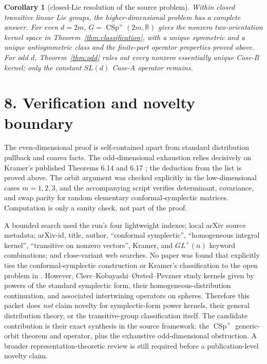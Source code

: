 \documentclass[11pt]{article}
\newtheorem{corollary}[theorem]{Corollary}
\newcommand{\R}{\mathbb R}
\newcommand{\CSp}{\operatorname{CSp}^{+}}
\begin{document}
\begin{corollary}[closed-Lie resolution of the source problem]\label{cor:full}
Within closed transitive linear Lie groups, the higher-dimensional problem has a complete answer.  For even $d=2m$, $G=\CSp(2m,\R)$ gives the nonzero two-orientation kernel space in Theorem~\ref{thm:classification}, with a unique symmetric and a unique antisymmetric class and the finite-part operator properties proved above.  For odd $d$, Theorem~\ref{thm:odd} rules out every nonzero essentially unique Case-B kernel; only the constant $SL(d)$ Case-A operator remains.
\end{corollary}

\section*{8. Verification and novelty boundary}

The even-dimensional proof is self-contained apart from standard distribution pullback and coarea facts.  The odd-dimensional exhaustion relies decisively on Kramer's published Theorems 6.14 and 6.17 \cite{Kramer}; the deduction from the list is proved above.  The orbit argument was checked explicitly in the low-dimensional cases $m=1,2,3$, and the accompanying script verifies determinant, covariance, and swap parity for random elementary conformal-symplectic matrices.  Computation is only a sanity check, not part of the proof.

A bounded search used the run's four lightweight indexes; local arXiv source metadata; arXiv-id, title, author, ``conformal symplectic'', ``homogeneous integral kernel'', ``transitive on nonzero vectors'', Kramer, and $GL^+(n)$ keyword combinations; and close-variant web searches.  No paper was found that explicitly ties the conformal-symplectic construction or Kramer's classification to the open problem in \cite{AK}.  However, Clerc--Kobayashi--\O rsted--Pevzner \cite{CKOP} study kernels given by powers of the standard symplectic form, their homogeneous-distribution continuation, and associated intertwining operators on spheres.  Therefore this packet does \emph{not} claim novelty for symplectic-form power kernels, their general distribution theory, or the transitive-group classification itself.  The candidate contribution is their exact synthesis in the source framework: the $\CSp$ generic-orbit theorem and operator, plus the exhaustive odd-dimensional obstruction.  A broader representation-theoretic review is still required before a publication-level novelty claim.
\end{document}
